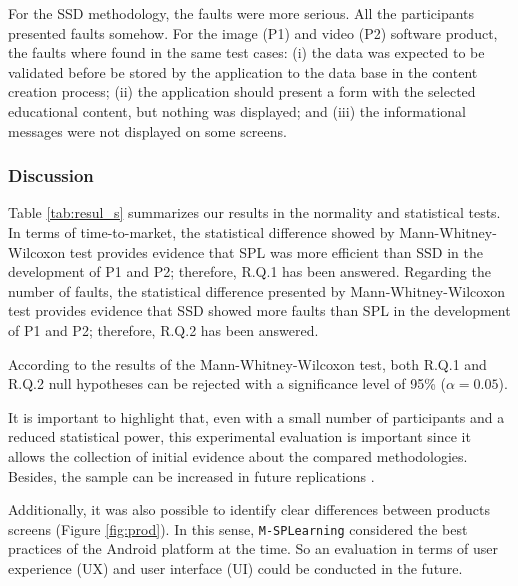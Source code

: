 \begin{itemize}
For the SSD methodology, the faults were more serious. All the participants presented faults somehow. For the image (P1) and video (P2) software product, the faults where found in the same test cases: (i) the data was expected to be validated before be stored by the application to the data base in the content creation process; (ii) the application should present a form with the selected educational content, but nothing was displayed; and (iii) the informational messages were not displayed on some screens.

\end{itemize}

\subsubsection*{Discussion}\label{sub:interpretation}

Table \ref{tab:resul_s} summarizes our results in the normality and statistical tests. In terms of time-to-market, the statistical difference showed by Mann-Whitney-Wilcoxon test provides evidence that SPL was more efficient than SSD in the development of P1 and P2; therefore, R.Q.1 has been answered. Regarding the number of faults, the statistical difference presented by Mann-Whitney-Wilcoxon test provides evidence that SSD showed more faults than SPL in the development of P1 and P2; therefore, R.Q.2 has been answered.

According to the results of the Mann-Whitney-Wilcoxon test, both R.Q.1 and R.Q.2 null hypotheses can be rejected with a significance level of 95\% ($\alpha = 0.05$).


It is important to highlight that, even with a small number of participants and a reduced statistical power, this experimental evaluation is important since it allows the collection of initial evidence about the compared methodologies. Besides, the sample can be increased in future replications \cite{falessi2017,host2000}.

Additionally, it was also possible to identify clear differences between products screens (Figure \ref{fig:prod}). In this sense, \texttt{M-SPLear\allowbreak ning} considered the best practices of the Android platform at the time. So an evaluation in terms of user experience (UX) and user interface (UI) could be conducted in the future.


